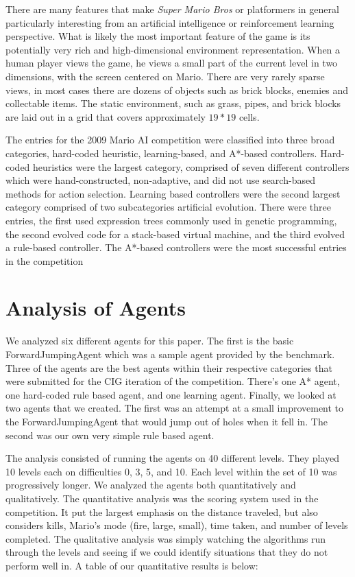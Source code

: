 \documentclass[12pt]{article}
\begin{document}
\begin{multicols}{2}
There are many features that make \textit {Super Mario Bros} or platformers in general particularly interesting from 
an artificial intelligence or reinforcement learning perspective. What is likely the most important feature of the game 
is its potentially very rich and high-dimensional environment representation. When a human player views the 
game, he views a small part of the current level in two dimensions, with the screen centered on Mario. There are 
very rarely sparse views, in most cases there are dozens of objects such as brick blocks, enemies and collectable 
items. The static environment, such as grass, pipes, and brick blocks are laid out in a grid that covers 
approximately $19 * 19$ cells.

The entries for the 2009 Mario AI competition were classified into three broad categories, hard-coded heuristic, 
learning-based, and A*-based controllers. Hard-coded heuristics were the largest category, comprised of seven 
different controllers which were hand-constructed, non-adaptive, and did not use search-based methods for action selection. Learning based controllers were the second largest category comprised of two subcategories artificial evolution. There were three entries, the first used expression trees commonly used in genetic programming, the second evolved code for a stack-based virtual machine, and the third evolved a rule-based controller. The A*-based controllers were the most successful entries in the competition

\section * {Analysis of Agents}
We analyzed six different agents for this paper.  The first is the basic ForwardJumpingAgent which 
was a sample agent provided by the benchmark.  Three of the agents are the best agents within
their respective categories that were submitted 
for the CIG iteration of the competition.  There's one A* agent, one hard-coded rule based agent, and 
one learning agent.  Finally, we looked at two agents that we created.  The first was an attempt at a 
small improvement to the ForwardJumpingAgent that would jump out of holes when it fell in.  
The second was our own very simple rule based agent.

The analysis consisted of running the agents on 40 different levels.  They played 10 levels each 
on difficulties 0, 3, 5, and 10.  Each level within the set of 10 was progressively longer.  We analyzed 
the agents both quantitatively and qualitatively.  The quantitative analysis was the scoring system 
used in the competition.  It put the largest emphasis on the distance traveled, but also considers 
kills, Mario's mode (fire, large, small), time taken, and number of levels completed.  The qualitative 
analysis was simply watching the algorithms run through the levels and seeing if we could identify 
situations that they do not perform well in.  A table of our quantitative results is below:
\end{multicols}
\end{document}
